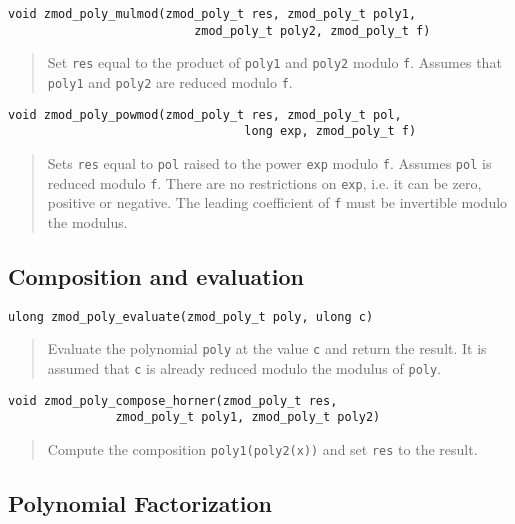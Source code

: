 \documentclass[a4paper,10pt]{article}
\newcommand{\code}{\lstinline}
\begin{document}
\begin{lstlisting}
void zmod_poly_mulmod(zmod_poly_t res, zmod_poly_t poly1,
                          zmod_poly_t poly2, zmod_poly_t f)
\end{lstlisting}
\begin{quote}
Set \code{res} equal to the product of \code{poly1} and \code{poly2} modulo \code{f}.  Assumes that \code{poly1} and \code{poly2} are reduced modulo \code{f}. 
\end{quote}

\begin{lstlisting}
void zmod_poly_powmod(zmod_poly_t res, zmod_poly_t pol,
                                 long exp, zmod_poly_t f)
\end{lstlisting}
\begin{quote}
Sets \code{res} equal to \code{pol} raised to the power \code{exp} modulo \code{f}.  Assumes \code{pol} is reduced modulo \code{f}.  There are no restrictions on \code{exp}, i.e. it can be zero, positive or negative.  The leading coefficient of \code{f} must be invertible modulo the modulus. 
\end{quote}

\subsection{Composition and evaluation}

\begin{lstlisting}
ulong zmod_poly_evaluate(zmod_poly_t poly, ulong c)
\end{lstlisting}
\begin{quote}
Evaluate the polynomial \code{poly} at the value \code{c} and return the result. It is assumed that \code{c} is already reduced modulo the modulus of \code{poly}.
\end{quote}

\begin{lstlisting}
void zmod_poly_compose_horner(zmod_poly_t res, 
               zmod_poly_t poly1, zmod_poly_t poly2)
\end{lstlisting}
\begin{quote}
Compute the composition \code{poly1(poly2(x))} and set \code{res} to the result.
\end{quote}

\subsection{Polynomial Factorization}
\end{document}
